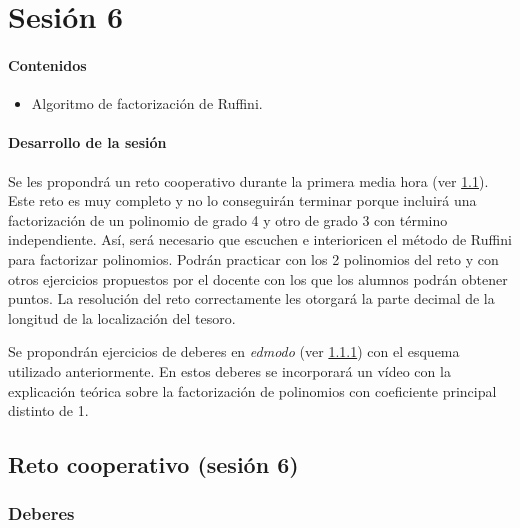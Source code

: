 \section{Sesión 6}


\paragraph{Contenidos}
\begin{itemize}
	\item Algoritmo de factorización de Ruffini.
\end{itemize}

\paragraph{Desarrollo de la sesión}

Se les propondrá un reto cooperativo durante la primera media hora (ver \ref{ses6:coop}).
%
Este reto es muy completo y no lo conseguirán terminar porque incluirá una factorización de un polinomio de grado 4 y otro de grado 3 con término independiente.
%
Así, será necesario que escuchen e interioricen el método de Ruffini para factorizar polinomios.
%
Podrán practicar con los 2 polinomios del reto y con otros ejercicios propuestos por el docente con los que los alumnos podrán obtener puntos.
%
La resolución del reto correctamente les otorgará la parte decimal de la longitud de la localización del tesoro.

Se propondrán ejercicios de deberes en \textit{edmodo} (ver \ref{ses6:deberes}) con el esquema utilizado anteriormente.
%
En estos deberes se incorporará un vídeo con la explicación teórica sobre la factorización de polinomios con coeficiente principal distinto de 1.

\subsection{Reto cooperativo (sesión 6)}
\label{ses6:coop}

\subsubsection{Deberes}
\label{ses6:deberes}




